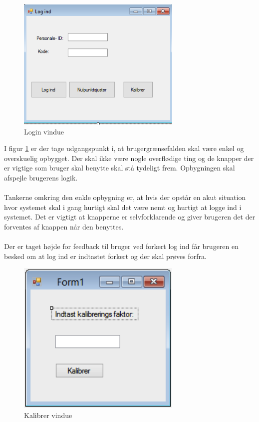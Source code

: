 \begin{figure}[H]
	\centering
	\includegraphics[width=0.7\textwidth]{Figurer/GUI/Logind_GUI}
	\caption{Login vindue}
	\label{Login vindue}
\end{figure}

I figur \ref{Login vindue} er der tage udgangspunkt i, at brugergrænsefalden skal være enkel og overskuelig opbygget. Der skal ikke være nogle overflødige ting og de knapper der er vigtige som bruger skal benytte skal stå tydeligt frem. Opbygningen skal afspejle brugerens logik.\\ \\ 
Tankerne omkring den enkle opbygning er, at hvis der opstår en akut situation hvor systemet skal i gang hurtigt skal det være nemt og hurtigt at logge ind i systemet. Det er vigtigt at knapperne er selvforklarende og giver brugeren det der forventes af knappen når den benyttes. \\ \\
Der er taget højde for feedback til bruger ved forkert log ind får brugeren en besked om at log ind er indtastet forkert og der skal prøves forfra. \\


\begin{figure}[H]
	\centering
	\includegraphics[width=0.7\textwidth]{Figurer/GUI/kalibrerGUI}
	\caption{Kalibrer vindue}
	\label{Kaliber vindue}
\end{figure}

